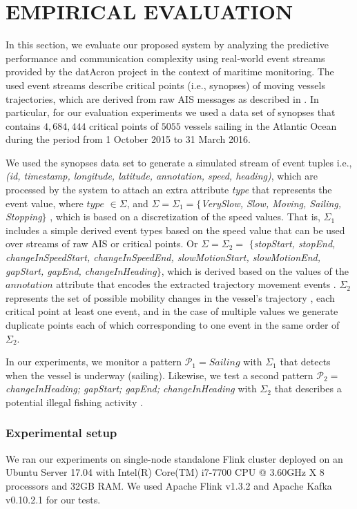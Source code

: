 \section{EMPIRICAL EVALUATION}
\label{sec:results}
In this section, we evaluate our proposed system by analyzing the predictive performance and communication complexity  using real-world event streams provided by the datAcron project in the context of maritime monitoring. The used event streams describe critical points (i.e., synopses) of moving vessels trajectories, which are derived from raw AIS messages as described in \cite{synopses1}. In particular, for our evaluation experiments we used a data set of synopses that contains $4,684,444$ critical points of $5055$ vessels sailing in the Atlantic Ocean during the period from 1 October 2015 to 31 March 2016.

\par We used the synopses data set to generate a simulated stream of event tuples  i.e., \textit{(id, timestamp, longitude, latitude, annotation, speed, heading)}, which are processed by the system to attach an extra attribute \textit{type} that represents the event value,  where $type$ $\in \Sigma$,  and $ \Sigma= \Sigma_1=$$\{$\textit{VerySlow, Slow, Moving,  Sailing, Stopping}$\}$ , which is based on a discretization of the speed values. That is, $\Sigma_1$ includes a simple derived event types based on the speed value that can be used over streams of  raw AIS  or critical points. Or $\Sigma=\Sigma_2=$ $\{$\textit{stopStart, stopEnd, changeInSpeedStart, changeInSpeedEnd,  slowMotionStart, slowMotionEnd, gapStart, gapEnd, changeInHeading}$\}$, which is derived based on the values of the $annotation$ attribute that encodes the extracted trajectory movement events \cite{synopses1}. $\Sigma_2$ represents the set of possible mobility changes in the vessel's trajectory \cite{synopses1}, each critical point at least one event, and in the case of multiple values we generate duplicate points each of which corresponding to one event in the same order of $\Sigma_2$.

\par In our experiments, we monitor a pattern $\mathcal{P}_1=Sailing$ with $\Sigma_1$ that detects when the vessel is underway (sailing). Likewise, we test a second pattern  $\mathcal{P}_2=$\textit{changeInHeading; gapStart; gapEnd; changeInHeading} with $\Sigma_2$ that describes a potential illegal fishing activity \cite{alevizos2017event}. 


\subsubsection*{Experimental setup} We ran our experiments on single-node standalone Flink cluster deployed on an Ubuntu Server 17.04 with Intel(R) Core(TM) i7-7700 CPU @ 3.60GHz X 8 processors and 32GB RAM. We used Apache Flink v1.3.2 and Apache Kafka v0.10.2.1 for our tests.


